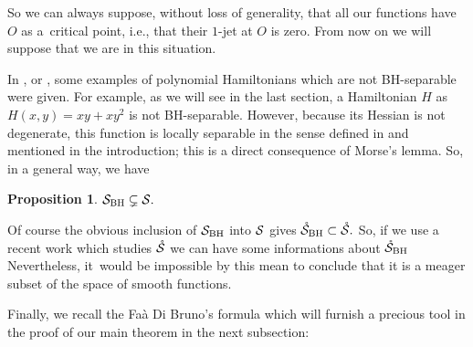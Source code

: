 \documentclass[10pt,a4paper]{amsart}
\numberwithin{equation}{section}
\newtheorem{Proposition}[Theorem]{Proposition}
 { \theoremstyle{definition}
\newtheorem{Remark}[Theorem]{Remark} }
\begin{document}
So we can always suppose, without loss of generality, that all our functions have $O$ as a~critical point, i.e., that their $1$-jet at $O$ is zero.
From now on we will suppose that we are in this situation.

In \cite{Br,BrMoTu}, or \cite{Fe}, some examples of polynomial Hamiltonians which are not BH-separable were given. For example, as we will see in the last section, a Hamiltonian $H$ as
$H(x,y)=xy+xy^2$ is not BH-separable. However, because its Hessian is not degenerate, this function is locally separable in the sense defined in \cite{BouBr} and mentioned in the introduction; this is a direct consequence of Morse's lemma. So, in a general way, we have

\begin{Proposition}
	${\cal S}_{\rm BH}\subsetneq{\cal S}.$
\end{Proposition}

\begin{Remark}
	Of course the obvious inclusion of ${\cal S}_{\rm BH}$ into ${\cal S}$ gives
	$\mathring{\cal S}_{\rm BH}\subset\mathring{\cal S}.$
	So, if we use a recent work \cite{BouBr} which studies $\mathring{\cal S}$ we can have some informations about $\mathring{\cal S}_{\rm BH}$ Nevertheless, it~would be impossible by this mean to conclude that it is a meager subset of the space of smooth functions.
\end{Remark}


Finally, we recall the Fa\`a Di Bruno's formula \cite{AMM1, AMM2} which will furnish a precious tool in the proof of our main theorem in the next subsection:
\end{document}
